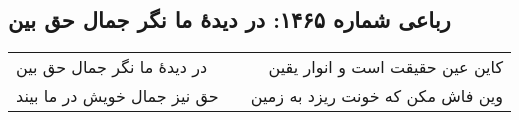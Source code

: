 \begin{center}
\section*{رباعی شماره ۱۴۶۵: در دیدهٔ ما نگر جمال حق بین}
\label{sec:1465}
\begin{longtable}{l p{0.5cm} r}
در دیدهٔ ما نگر جمال حق بین
&&
کاین عین حقیقت است و انوار یقین
\\
حق نیز جمال خویش در ما بیند
&&
وین فاش مکن که خونت ریزد به زمین
\\
\end{longtable}
\end{center}
